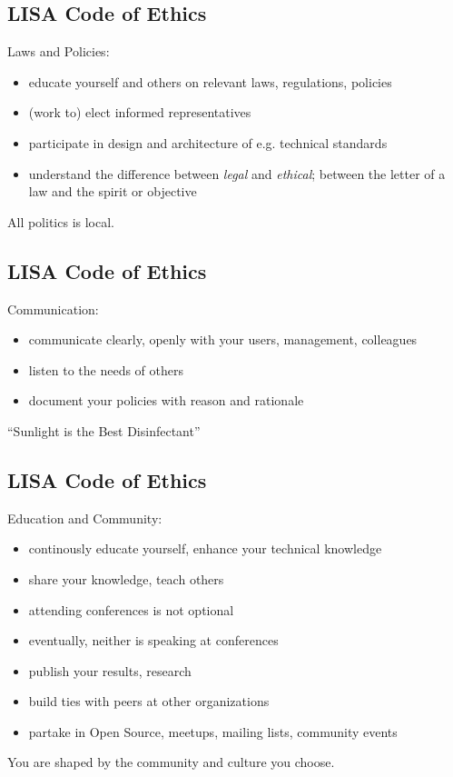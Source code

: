 \documentclass[xga]{xdvislides}
\begin{document}
\subsection{LISA Code of Ethics}
Laws and Policies:
\begin{itemize}
	\item educate yourself and others on relevant laws, regulations, policies
	\item (work to) elect informed representatives
	\item participate in design and architecture of e.g. technical standards
	\item understand the difference between {\em
legal} and {\em ethical}; between the letter of a law
and the spirit or objective
\end{itemize}
\vspace{.5in}
All politics is local.

\subsection{LISA Code of Ethics}
Communication:
\begin{itemize}
	\item communicate clearly, openly with your users, management, colleagues
	\item listen to the needs of others
	\item document your policies with reason and rationale
\end{itemize}
\vspace{.5in}
``Sunlight is the Best Disinfectant''


\subsection{LISA Code of Ethics}
Education and Community:
\begin{itemize}
	\item continously educate yourself, enhance your technical knowledge
	\item share your knowledge, teach others
	\item attending conferences is not optional
	\item eventually, neither is speaking at conferences
	\item publish your results, research
	\item build ties with peers at other organizations
	\item partake in Open Source, meetups, mailing lists, community events
\end{itemize}
\vspace{.5in}
You are shaped by the community and culture you choose.
\end{document}
